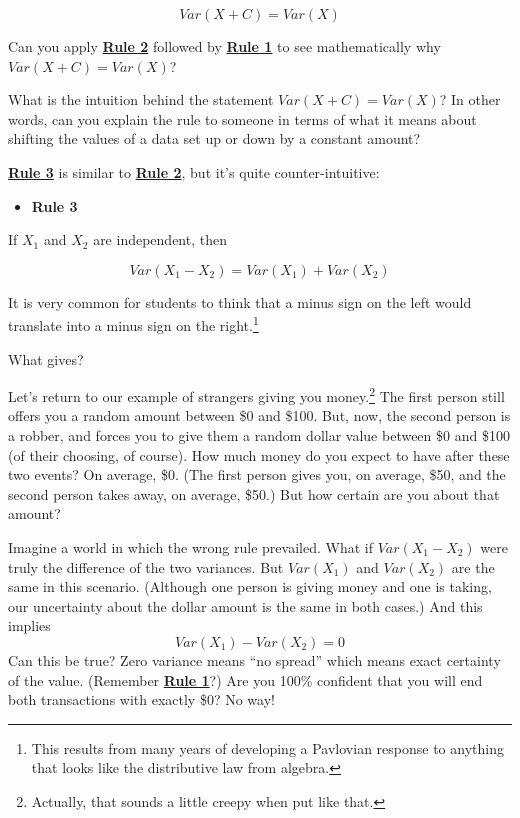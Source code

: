 \documentclass[
]{book}
\providecommand{\tightlist}{%
  \setlength{\itemsep}{0pt}\setlength{\parskip}{0pt}}
\begin{document}
\[
Var\left(X + C\right) = Var\left(X\right)
\]

Can you apply \protect\hyperlink{Rule2}{\textbf{Rule 2}} followed by \protect\hyperlink{Rule1}{\textbf{Rule 1}} to see mathematically why \(Var\left(X + C\right) = Var\left(X\right)\)?

What is the intuition behind the statement \(Var\left(X + C\right) = Var\left(X\right)\)? In other words, can you explain the rule to someone in terms of what it means about shifting the values of a data set up or down by a constant amount?

\protect\hyperlink{Rule3}{\textbf{Rule 3}} is similar to \protect\hyperlink{Rule2}{\textbf{Rule 2}}, but it's quite counter-intuitive:

\begin{itemize}
\tightlist
\item
  \textbf{Rule 3}
\end{itemize}

If \(X_{1}\) and \(X_{2}\) are independent, then

\[
Var\left(X_{1} - X_{2}\right) =
Var\left(X_{1}\right) + Var\left(X_{2}\right)
\]

It is very common for students to think that a minus sign on the left would translate into a minus sign on the right.\footnote{This results from many years of developing a Pavlovian response to anything that looks like the distributive law from algebra.}

What gives?

Let's return to our example of strangers giving you money.\footnote{Actually, that sounds a little creepy when put like that.} The first person still offers you a random amount between \$0 and \$100. But, now, the second person is a robber, and forces you to give them a random dollar value between \$0 and \$100 (of their choosing, of course). How much money do you expect to have after these two events? On average, \$0. (The first person gives you, on average, \$50, and the second person takes away, on average, \$50.) But how certain are you about that amount?

Imagine a world in which the wrong rule prevailed. What if \(Var\left(X_{1} - X_{2}\right)\) were truly the difference of the two variances. But \(Var\left(X_{1}\right)\) and \(Var\left(X_{2}\right)\) are the same in this scenario. (Although one person is giving money and one is taking, our uncertainty about the dollar amount is the same in both cases.) And this implies
\[
Var\left(X_{1}\right) - Var\left(X_{2}\right) = 0
\]
Can this be true? Zero variance means ``no spread'' which means exact certainty of the value. (Remember \protect\hyperlink{Rule1}{\textbf{Rule 1}}?) Are you 100\% confident that you will end both transactions with exactly \$0? No way!
\end{document}
